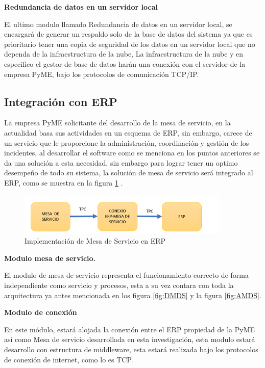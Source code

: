  \textbf{Redundancia de datos en un servidor local} 
 
El ultimo modulo llamado Redundancia de datos en un servidor local, se encargará de generar un respaldo solo de la base de datos del sistema ya que es prioritario tener una copia de seguridad de los datos en un servidor local que no dependa de la infraestructura de la nube, La infraestructura de la nube y en específico el gestor de base de datos harán una conexión con el servidor de la empresa PyME, bajo los protocolos de comunicación TCP/IP.

\subsection{Integración con ERP}

La empresa PyME solicitante del desarrollo de la mesa de servicio, en la actualidad basa sus actividades en un esquema de ERP, sin embargo, carece de un  servicio que le proporcione la administración, coordinación y gestión de los incidentes, al desarrollar el software como se menciona en los puntos anteriores se da una solución a esta necesidad, sin embargo para lograr tener un optimo desempeño de todo su sistema, la solución de  mesa de servicio será integrado al ERP, como se muestra en la figura \ref{fig:ERP-MDS} .
\begin{figure}[htb]
	\centering
	\includegraphics[width=0.9\textwidth]{Capitulo1/Img/ERP-MDS}
	\caption{Implementación de Mesa de Servicio en ERP}
	\label{fig:ERP-MDS}
	
\end{figure}


\textbf{Modulo mesa de servicio.}

El modulo  de  mesa de servicio representa el funcionamiento correcto de forma independiente como servicio y procesos, esta a su vez contara con toda la arquitectura ya antes mencionada en los figura \ref{fig:DMDS} y  la figura \ref{fig:AMDS}.

\textbf{Modulo de conexión }

En este módulo, estará alojada la conexión entre el ERP propiedad de la PyME así como Mesa de servicio desarrollada en esta investigación, esta modulo estará desarrollo con estructura de middleware, esta estará realizada bajo los protocolos de conexión de internet, como lo es TCP.


